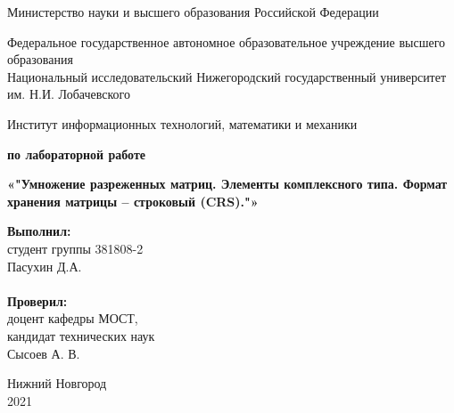 \documentclass{report}
\begin{document}
\begin{titlepage}

\begin{center}
Министерство науки и высшего образования Российской Федерации
\end{center}

\begin{center}
Федеральное государственное автономное образовательное учреждение высшего образования \\
Национальный исследовательский Нижегородский государственный университет им. Н.И. Лобачевского
\end{center}

\begin{center}
Институт информационных технологий, математики и механики
\end{center}

\vspace{4em}

\begin{center}
\textbf{ по лабораторной работе} \\
\end{center}
\begin{center}
\textbf{\Large«"Умножение разреженных матриц. Элементы комплексного типа. Формат хранения матрицы – строковый (CRS)."»} \\
\end{center}

\vspace{4em}

\newbox{\lbox}
\newlength{\maxl}
\setlength{\maxl}{\wd\lbox}
\hfill\parbox{7cm}{
\hspace*{5cm}\hspace*{-5cm}\textbf{Выполнил:} \\ студент группы 381808-2 \\ Пасухин Д.А.\\
\\
\hspace*{5cm}\hspace*{-5cm}\textbf{Проверил:}\\ доцент кафедры МОСТ, \\ кандидат технических наук \\ Сысоев А. В.\\
}
\vspace{\fill}

\begin{center} Нижний Новгород \\ 2021 \end{center}

\end{titlepage}
\newpage
\setcounter{page}{2}
\tableofcontents
\newpage
\end{document}
